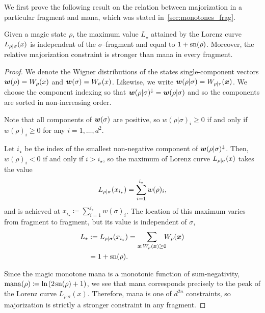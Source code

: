 \documentclass[pra,
aps,
twocolumn,
superscriptaddress,
groupedaddress,
nofootinbib,
reprint
]{revtex4-1}
\begin{document}
We first prove the following result on the relation between majorization in a particular fragment and mana, which was stated in~\cref{sec:monotones_frag}.
\begingroup
\def\thetheorem{\ref{lem:lcmax}}
\begin{theorem}
	Given a magic state $\rho$, the maximum value $L_\star$ attained by the Lorenz curve ${L_{\rho|\sigma}}(x)$ is independent of the $\sigma$--fragment and equal to $1+{{\rm{sn}}(\rho)}$. Moreover, the relative majorization constraint is stronger than mana in every fragment.
\end{theorem}
\addtocounter{theorem}{-1}
\endgroup
\begin{proof}
	We denote the Wigner distributions of the states single-component vectors $\boldsymbol{w}(\rho)=W_\rho(x)$ and $ \boldsymbol{w}(\sigma)=W_\sigma(x)$. Likewise, we write $\boldsymbol{w}(\rho|\sigma) = W_{\rho|\tau}(\boldsymbol{x})$.
	We choose the component indexing so that $\boldsymbol{w}(\rho|\sigma)^\downarrow = \boldsymbol{w}(\rho|\sigma)$ and so the components are sorted in non-increasing order.

Note that all components of $\bm{w}(\sigma)$ are positive, so $w(\rho|\sigma)_i \geq 0$ if and only if $w(\rho)_i \geq 0$ for any $i=1,\dots,d^2$.
	
	Let $i_\star$ be the index of the smallest non-negative component of $\boldsymbol{w}(\rho|\sigma)^\downarrow$.
	Then, $w(\rho)_i < 0$ if and only if $i > i_\star$, so the maximum of Lorenz curve ${L_{\rho|\sigma}}(x)$ takes the value 
	\begin{equation}
		{L_{\rho|\sigma}}(x_{i_\star}) = \sum_{i=1}^{i_\star} w(\rho)_i,
	\end{equation}
	and is achieved at $x_{i_\star} \coloneqq \sum_{i=1}^{i_\star} w(\sigma)_i$. The location of this maximum varies from fragment to fragment, but its value is independent of $\sigma$,
	\begin{align}
	L_\star &:=	\lc{\rho}{\sigma}(x_{i_\star}) 
		= \sum\limits_{\bmx: \W[\bmx]{\rho} \geq 0}\hspace{-5pt} \W[\bmx]{\rho} \nonumber \\
		&= 1 + \sn{\rho}.
	\end{align}
	
Since the magic monotone mana is a monotonic function of sum-negativity, $\rm{mana}(\rho) \coloneqq \ln \hspace{1pt}(2\hspace{1pt}{{\rm{sn}}(\rho)}+1)$, we see that mana corresponds precisely to the peak of the Lorenz curve $L_{\rho|\sigma}(x)$. Therefore, mana is one of $d^{2n}$ constraints, so majorization is strictly a stronger constraint in any fragment.
\end{proof}
\end{document}
